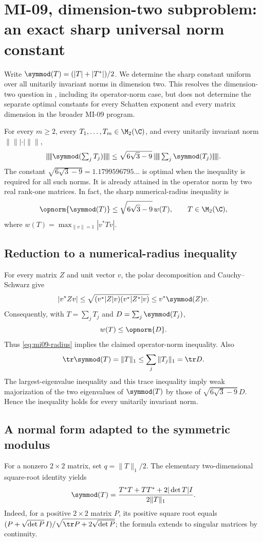 \section{MI-09, dimension-two subproblem: an exact sharp universal norm constant}
\label{sec:mi09}
Write $\symmod(T)=(|T|+|T^*|)/2$. We determine the sharp constant uniform over all unitarily invariant norms in dimension two. This resolves the dimension-two question in \cite[Problem 1.11]{Zhang2026}, including its operator-norm case, but does not determine the separate optimal constants for every Schatten exponent and every matrix dimension in the broader MI-09 program.

\begin{theorem}\label{thm:mi09}
For every $m\geq2$, every $T_1,\ldots,T_m\in\M_2(\C)$, and every unitarily invariant norm $\|\!\|\!|\cdot|\!\|\!\|$,
\[
 \|\!\|\!|\symmod(\textstyle\sum_jT_j)|\!\|\!\|
 \leq \sqrt{6\sqrt3-9}\,
 \|\!\|\!|\textstyle\sum_j\symmod(T_j)|\!\|\!\|.
\]
The constant $\sqrt{6\sqrt3-9}=1.1799596795\ldots$ is optimal when the inequality is required for all such norms. It is already attained in the operator norm by two real rank-one matrices. In fact, the sharp numerical-radius inequality is
\begin{equation}\label{eq:mi09-radius}
 \opnorm{\symmod(T)}\leq\sqrt{6\sqrt3-9}\,w(T),\qquad T\in\M_2(\C),
\end{equation}
where $w(T)=\max_{\|v\|=1}|v^*Tv|$.
\end{theorem}

\subsection{Reduction to a numerical-radius inequality}
For every matrix $Z$ and unit vector $v$, the polar decomposition and Cauchy--Schwarz give
\[
 |v^*Zv|\leq\sqrt{(v^*|Z|v)(v^*|Z^*|v)}\leq v^*\symmod(Z)v.
\]
Consequently, with $T=\sum_jT_j$ and $D=\sum_j\symmod(T_j)$,
\[
 w(T)\leq\opnorm{D}.
\]
Thus \eqref{eq:mi09-radius} implies the claimed operator-norm inequality. Also
\[
 \tr\symmod(T)=\|T\|_1\leq\sum_j\|T_j\|_1=\tr D.
\]
The largest-eigenvalue inequality and this trace inequality imply weak majorization of the two eigenvalues of $\symmod(T)$ by those of $\sqrt{6\sqrt3-9}\,D$. Hence the inequality holds for every unitarily invariant norm.

\subsection{A normal form adapted to the symmetric modulus}
For a nonzero $2\times2$ matrix, set $q=\|T\|_1/2$. The elementary two-dimensional square-root identity yields
\begin{equation}\label{eq:mi09-mod-formula}
 \symmod(T)=\frac{T^*T+TT^*+2|\det T|I}{2\|T\|_1}.
\end{equation}
Indeed, for a positive $2\times2$ matrix $P$, its positive square root equals
$(P+\sqrt{\det P}\,I)/\sqrt{\tr P+2\sqrt{\det P}}$; the formula extends to singular matrices by continuity.

